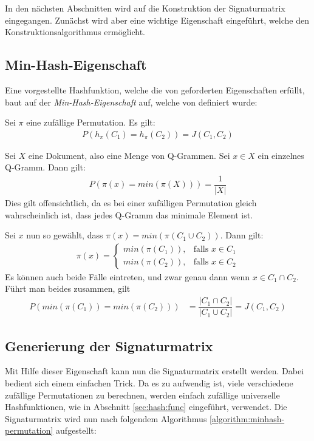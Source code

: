 In den nächsten Abschnitten wird auf die Konstruktion der Signaturmatrix eingegangen. Zunächst wird aber eine wichtige Eigenschaft eingeführt, welche den Konstruktionsalgorithmus ermöglicht.
\subsection{Min-Hash-Eigenschaft}
\label{sec:lsh:min:eig}
Eine vorgestellte Hashfunktion, welche die von \citet{Indyk1998} geforderten Eigenschaften erfüllt, baut auf der \textit{Min-Hash-Eigenschaft} auf, welche von \citet{Leskovec2014a} definiert wurde:
\begin{theorem}
	Sei $\pi$ eine zufällige Permutation. Es gilt:
	\begin{align*}
	P(h_\pi (C_1) = h_\pi (C_2)) = J(C_1, C_2)
	\end{align*}
\end{theorem}

\begin{beweis}
Sei $X$ eine Dokument, also eine Menge von Q-Grammen. Sei $x \in X$ ein einzelnes Q-Gramm. Dann gilt:
\begin{align*}
	P(\pi(x) = min(\pi(X))) = \dfrac{1}{\vert X \vert}
\end{align*}
Dies gilt offensichtlich, da es bei einer zufälligen Permutation gleich wahrscheinlich ist, dass jedes Q-Gramm das minimale Element ist. 

Sei $x$ nun so gewählt, dass $\pi(x) = min(\pi (C_1 \cup C_2))$. Dann gilt:
\begin{align*}
	\pi(x) =\begin{cases}
		min(\pi(C_1)), & \text{falls } x \in C_1 \\
		min(\pi(C_2)), & \text{falls } x \in C_2
	\end{cases}
\end{align*}
Es können auch beide Fälle eintreten, und zwar genau dann wenn $x \in C_1 \cap C_2$. Führt man beides zusammen, gilt
\begin{align*}
	P(min(\pi (C_1)) = min (\pi (C_2))) &= \dfrac{\vert C_1 \cap C_2 \vert}{\vert C_1 \cup C_2 \vert} = J(C_1, C_2)
\end{align*}
\end{beweis}

\subsection{Generierung der Signaturmatrix}
\label{sec:lsh:min:sig}
Mit Hilfe dieser Eigenschaft kann nun die Signaturmatrix erstellt werden. Dabei bedient sich \citet{Leskovec2014a} einem einfachen Trick. Da es zu aufwendig ist, viele verschiedene zufällige Permutationen zu berechnen, werden einfach zufällige universelle Hashfunktionen, wie in Abschnitt \ref{sec:hash:func} eingeführt, verwendet. Die Signaturmatrix wird nun nach folgendem Algorithmus \ref{algorithm:minhash-permutation} aufgestellt:

